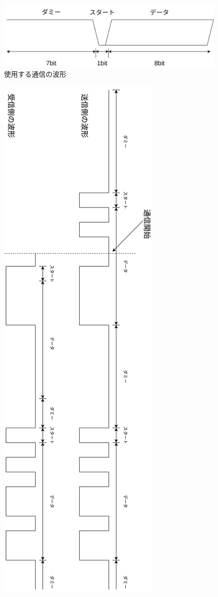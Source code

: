 \documentclass[a4paper,10pt]{article}
\begin{document}
\begin{multicols}{2}
\begin{figure}[H]
    \centering
    \includegraphics[width=0.9\linewidth]{figure/protocol.png} 
    \caption{使用する通信の波形} 
    \label{fig:protocol}
  \end{figure}

\begin{figure}[H]
    \centering
    \includegraphics[width=0.6\linewidth]{figure/saikai_protocol.png} 

\end{figure}
\end{multicols}
\end{document}
